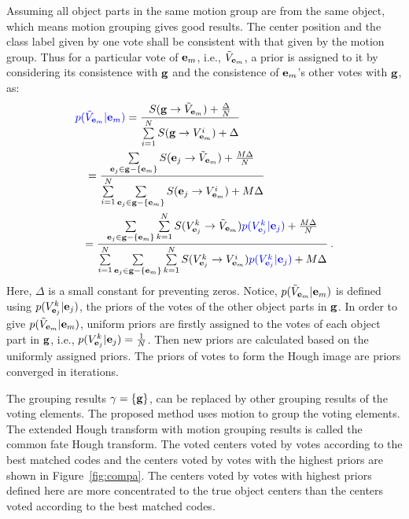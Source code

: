 \documentclass[10pt,twocolumn,letterpaper]{article}
\begin{document}
Assuming all object parts in the same motion group are from the same object, which means motion grouping gives good results. The center position and the class label given by one vote shall be consistent with that given by the motion group.
Thus for a particular vote of ${\bf{e}}_m$, i.e., ${\tilde{V}}_{{\bf{e}}_m}$, a prior is assigned to it by considering its consistence with $\bf{g}$ and the consistence of ${\bf{e}}_m$'s other votes  with $\bf{g}$, as:
\begin{equation}
\begin{aligned}
{\color{blue}p(}&{\color{blue}{\tilde{V}}_{{\bf{e}}_m}|{\bf{e}}_m)}
= \frac
{S({\bf{g}} \to {{\tilde{V}}_{{\bf{e}}_m}}) + \frac{\Delta } N}
{\sum\limits^N_{i=1}{ S({\bf{g}} \to {V^i_{{{\bf{e}}_m}}})} + \Delta }\\
&
= \frac
{ \sum\limits_{{{\bf{e}}_j} \in {\bf{g}}- \{ {{\bf{e}}_m} \}} {S({{{\bf{e}}_j} \to {{\tilde{V}}_{{{\bf{e}}_m}}}})}  + \frac{M\Delta } N}
{\sum\limits^N_{i=1}{
\sum\limits_{{{\bf{e}}_j} \in {\bf{g}}-\{ {{\bf{e}}_m} \}} {S({{{\bf{e}}_j} \to {V^i_{{{\bf{e}}_m}}}})}
} + M\Delta }\\
&
\begin{aligned}
= \frac
{ \sum\limits_{{{\bf{e}}_j} \in {\bf{g}}- \{ {{\bf{e}}_m} \}} {
\sum\limits^N_{k=1} {S({{V^k_{{{\bf{e}}_j}}} \to {{\tilde{V}}_{{{\bf{e}}_m}}}})\color{blue}{p(V^k_{{\bf{e}}_j}|{\bf{e}}_j)}}
}  + \frac{M\Delta } N}
{\sum\limits^N_{i=1}{
\sum\limits_{{{\bf{e}}_j} \in {\bf{g}}- \{ {{\bf{e}}_m} \}} {
\sum\limits^N_{k=1} {S({{V^k_{{{\bf{e}}_j}}} \to {V^i_{{{\bf{e}}_m}}}})\color{blue}{p(V^k_{{\bf{e}}_j}|{\bf{e}}_j)}}
}
} + M\Delta }\:.
\end{aligned}
\end{aligned}
\label{eq4}
\end{equation}
Here, $\Delta$ is a small constant for preventing zeros. Notice, $p({\tilde{V}}_{{\bf{e}}_m}|{\bf{e}}_m)$ is defined using $p(V^k_{{\bf{e}}_j}|{\bf{e}}_j)$, the priors of the votes of the other object parts in ${\bf{g}}$. In order to give $p({\tilde{V}}_{{\bf{e}}_m}|{\bf{e}}_m)$, uniform priors are firstly assigned to the votes of each object part in ${\bf{g}}$, i.e., $p(V^k_{{\bf{e}}_j}|{\bf{e}}_j)=\frac{1}{N}$. Then new priors are calculated based on the uniformly assigned priors. The priors of votes to form the Hough image are priors converged in iterations.

The grouping results $\gamma=\{\bf{g}\}$, can be replaced by other grouping results of the voting elements. The proposed method uses motion to group the voting elements. The extended Hough transform with motion grouping results is called the common fate Hough transform. The voted centers voted by votes according to the best matched codes and the centers voted by votes with the highest priors are shown in Figure~\ref{fig:compa}. The centers voted by votes with highest priors defined here are more concentrated to the true object centers than the centers voted according to the best matched codes.
\end{document}
